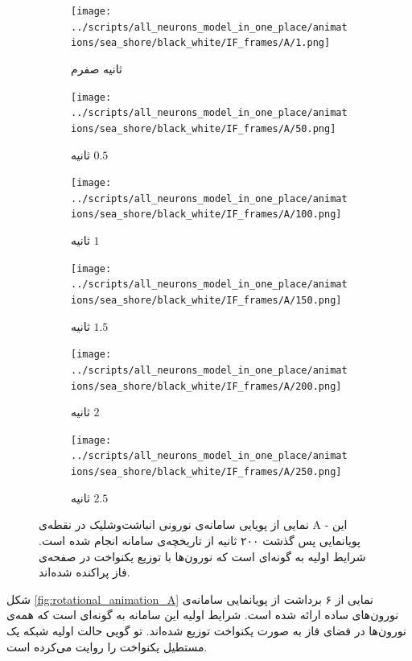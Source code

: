 \begin{figure}
	\begin{subfigure}{0.5\textwidth}
		\texttt{[image: ../scripts/all\_neurons\_model\_in\_one\_place/animations/sea\_shore/black\_white/IF\_frames/A/1.png]}
		\caption{
			ثانیه صفرم		
		}
	\end{subfigure}
	\hfill
	\begin{subfigure}{0.5\textwidth}
		\texttt{[image: ../scripts/all\_neurons\_model\_in\_one\_place/animations/sea\_shore/black\_white/IF\_frames/A/50.png]}
		\caption{
			ثانیه $0.5$
		}
	\end{subfigure}
	\hfill
	\begin{subfigure}{0.5\textwidth}
		\texttt{[image: ../scripts/all\_neurons\_model\_in\_one\_place/animations/sea\_shore/black\_white/IF\_frames/A/100.png]}
		\caption{
			ثانیه $1$		
		}
	\end{subfigure}
	\hfill
	\begin{subfigure}{0.5\textwidth}
		\texttt{[image: ../scripts/all\_neurons\_model\_in\_one\_place/animations/sea\_shore/black\_white/IF\_frames/A/150.png]}
		\caption{
			ثانیه $1.5$
		}
	\end{subfigure}
	\hfill
	\begin{subfigure}{0.5\textwidth}
		\texttt{[image: ../scripts/all\_neurons\_model\_in\_one\_place/animations/sea\_shore/black\_white/IF\_frames/A/200.png]}
		\caption{
			ثانیه $2$
		}
	\end{subfigure}
	\hfill
	\begin{subfigure}{0.5\textwidth}
		\texttt{[image: ../scripts/all\_neurons\_model\_in\_one\_place/animations/sea\_shore/black\_white/IF\_frames/A/250.png]}
		\caption{
			ثانیه $2.5$
		}
	\end{subfigure}
	\hfill
	\caption{
		نمایی از پویایی سامانه‌ی نورونی انباشت‌وشلیک در نقطه‌ی A - این پویانمایی پس گذشت ۲۰۰ ثانیه از تاریخچه‌ی سامانه انجام شده است. شرایط اولیه به گونه‌ای است که نورون‌ها با توزیع یکنواخت در صفحه‌ی فاز پراکنده شده‌اند.	
	}
	\label{fig:IF_animation_A}
\end{figure}


شکل
\ref{fig:rotational_animation_A}
نمایی از ۶ برداشت از پویانمایی سامانه‌ی نورون‌های ساده ارائه شده است. شرایط اولیه این سامانه به گونه‌ای است که همه‌ی نورون‌ها در فضای فاز به صورت یکنواخت توزیع شده‌اند. تو گویی حالت اولیه شبکه یک مستطیل یکنواخت را روایت می‌کرده است.\\

